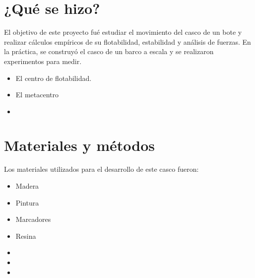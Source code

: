 \documentclass[letterpaper]{article}
\begin{document}
\section{¿Qué se hizo?}
El objetivo de este proyecto fué estudiar el movimiento del casco de un bote y realizar cálculos empíricos
de su flotabilidad, estabilidad y análisis de fuerzas. En la práctica, se construyó el casco de un barco 
a escala y se realizaron experimentos para medir.
\begin{itemize}
	\item El centro de flotabilidad.
	\item El metacentro
	\item
\end{itemize}
\section{Materiales y métodos}
Los materiales utilizados para el desarrollo de este casco fueron:
\begin{itemize}
	\item Madera
	\item Pintura
	\item Marcadores
	\item Resina
	\item
	\item
	\item
\end{itemize}

\newpage
\end{document}
